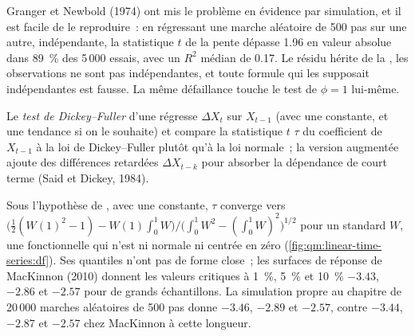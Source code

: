 Granger et Newbold (1974) ont mis le problème en évidence par simulation, et il est facile de le reproduire~: en régressant une marche aléatoire de 500 pas sur une autre,
indépendante, la statistique $t$ de la pente dépasse 1.96 en valeur absolue dans 89~\% des 5\,000 essais, avec un $R^2$ médian de 0.17. Le résidu
hérite de la , les observations ne sont pas indépendantes, et toute formule qui les supposait indépendantes est fausse. La même défaillance touche le
test de $\phi = 1$ lui-même.

\begin{definition}\label{def:qm:linear-time-series:df}
Le \emph{test de Dickey--Fuller} d'une  régresse $\Delta X_t$ sur $X_{t-1}$ (avec une constante, et une tendance si on le souhaite) et
compare la statistique $t$ $\tau$ du coefficient de $X_{t-1}$ à la loi de Dickey--Fuller plutôt qu'à la loi normale~; la version augmentée
ajoute des différences retardées $\Delta X_{t-k}$ pour absorber la dépendance de court terme (Said et Dickey, 1984).
\end{definition}

Sous l'hypothèse de , avec une constante, $\tau$ converge vers $\bigl(\frac12(W(1)^2 - 1) - W(1)\int_0^1W\bigr)/\bigl(\int_0^1W^2 - (\int_0^1W)^2\bigr)^{1/2}$ pour un
 standard $W$, une fonctionnelle qui n'est ni normale ni centrée en zéro (\cref{fig:qm:linear-time-series:df}). Ses quantiles n'ont pas de
forme close~; les surfaces de réponse de MacKinnon (2010) donnent les valeurs critiques à 1~\%, 5~\% et 10~\% $-3.43$, $-2.86$ et $-2.57$ pour de grands échantillons. La simulation propre au chapitre
de 20\,000 marches aléatoires de 500 pas donne $-3.46$, $-2.89$ et $-2.57$, contre $-3.44$, $-2.87$ et $-2.57$ chez MacKinnon à cette longueur.

